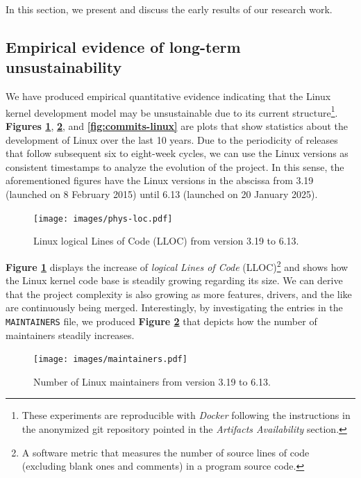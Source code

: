 \documentclass[sigconf]{acmart} %
\begin{document}
In this section, we present and discuss the early results of our research work.

\subsection{Empirical evidence of long-term unsustainability}

We have produced empirical quantitative evidence indicating that the Linux
kernel development model may be unsustainable due to its current
structure\footnote{These experiments are reproducible with \textit{Docker}
following the instructions in the anonymized git repository pointed in the
\textit{Artifacts Availability} section.}. \textbf{Figures \ref{fig:loc-linux}},
\textbf{\ref{fig:maintainers-linux}}, and \textbf{\ref{fig:commits-linux}} are
plots that show statistics about the development of Linux over the last 10
years. Due to the periodicity of releases that follow subsequent six to
eight-week cycles, we can use the Linux versions as consistent timestamps to
analyze the evolution of the project. In this sense, the aforementioned figures
have the Linux versions in the abscissa from 3.19 (launched on 8 February 2015)
until 6.13 (launched on 20 January 2025).

\begin{figure}[ht]
    \centering
    \texttt{[image: images/phys-loc.pdf]}
    \caption{Linux logical Lines of Code (LLOC) from version 3.19 to 6.13.\label{fig:loc-linux}}
\end{figure}

\textbf{Figure \ref{fig:loc-linux}} displays the increase of \textit{logical
Lines of Code} (LLOC)\footnote{A software metric that measures the number of
source lines of code (excluding blank ones and comments) in a program source
code.} and shows how the Linux kernel code base is steadily growing regarding
its size. We can derive that the project complexity is also growing as more
features, drivers, and the like are continuously being merged.  Interestingly,
by investigating the entries in the \texttt{MAINTAINERS} file, we produced
\textbf{Figure \ref{fig:maintainers-linux}} that depicts how the number of
maintainers steadily increases.

\begin{figure}[ht]
    \centering
    \texttt{[image: images/maintainers.pdf]}
    \caption{Number of Linux maintainers from version 3.19 to 6.13.\label{fig:maintainers-linux}}
\end{figure}
\end{document}
